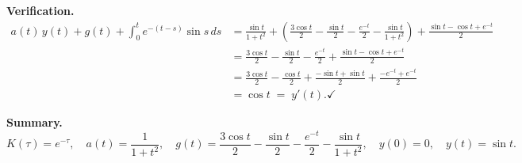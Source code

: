 \documentclass[11pt]{article}
\begin{document}
\medskip\noindent\textbf{Verification.}
\begin{align*}
  a(t)\,y(t) + g(t) + \int_0^t e^{-(t-s)}\sin s\,ds
  &= \frac{\sin t}{1+t^2}
   + \left(\frac{3\cos t}{2} - \frac{\sin t}{2}
           - \frac{e^{-t}}{2} - \frac{\sin t}{1+t^2}\right)
   + \frac{\sin t-\cos t+e^{-t}}{2} \\[4pt]
  &= \frac{3\cos t}{2} - \frac{\sin t}{2} - \frac{e^{-t}}{2}
   + \frac{\sin t - \cos t + e^{-t}}{2} \\[4pt]
  &= \frac{3\cos t}{2} - \frac{\cos t}{2}
   + \frac{-\sin t+\sin t}{2}
   + \frac{-e^{-t}+e^{-t}}{2} \\[4pt]
  &= \cos t \;=\; y'(t). \checkmark
\end{align*}

\medskip\noindent\textbf{Summary.}
\[
  \boxed{
    K(\tau)=e^{-\tau},\quad
    a(t)=\frac{1}{1+t^2},\quad
    g(t)=\frac{3\cos t}{2}-\frac{\sin t}{2}-\frac{e^{-t}}{2}-\frac{\sin t}{1+t^2},
    \quad y(0)=0,\quad y(t)=\sin t.
  }
\]
\end{document}
